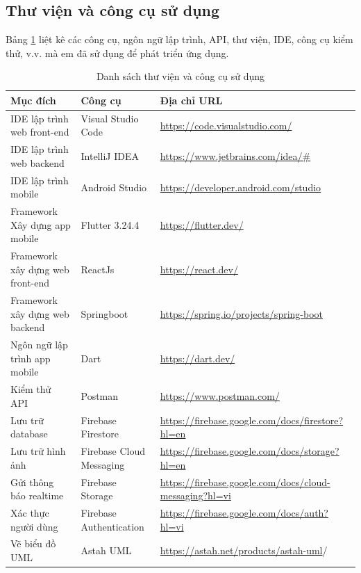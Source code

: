 \documentclass[../DoAn.tex]{subfiles}
\begin{document}
\subsection{Thư viện và công cụ sử dụng}
Bảng \ref{tab:my_label} liệt kê các công cụ, ngôn ngữ lập trình, API, thư viện, IDE, công cụ kiểm thử, v.v. mà em đã sử dụng để phát triển ứng dụng.
\begin{table}[H]
\centering{}
    \begin{tabular}{|p{4cm}|p{3cm}|p{7cm}|}
        \hline
        \textbf{Mục đích} & \textbf{Công cụ}       & \textbf{Địa chỉ URL}    \\ \hline
        IDE lập trình web front-end    & Visual Studio Code & \url{https://code.visualstudio.com/} \\ \hline
        IDE lập trình web backend    & IntelliJ IDEA & \url{https://www.jetbrains.com/idea/#} \\ \hline
        IDE lập trình mobile    & Android Studio & \url{https://developer.android.com/studio}  \\ \hline
        Framework Xây dựng app mobile              & Flutter 3.24.4                 & \url{https://flutter.dev/}                     \\ \hline
         Framework xây dựng web front-end              & ReactJs                   & \url{https://react.dev/} \\ \hline
         Framework xây dựng web backend & Springboot & \url{https://spring.io/projects/spring-boot}
         \\ \hline
         Ngôn ngữ lập trình app mobile & Dart & \url{https://dart.dev/}
         \\ \hline
         Kiểm thử API & Postman &
         \url{https://www.postman.com/}
         \\ \hline
         Lưu trữ database & Firebase Firestore & \url{https://firebase.google.com/docs/firestore?hl=en} 
         \\ \hline
         Lưu trữ hình ảnh & Firebase Cloud Messaging  & 
         \url{https://firebase.google.com/docs/storage?hl=en}
         \\ \hline
        Gửi thông báo realtime & Firebase Storage  & 
         \url{https://firebase.google.com/docs/cloud-messaging?hl=vi}
         \\ \hline
         Xác thực người dùng & Firebase Authentication  & 
         \url{https://firebase.google.com/docs/auth?hl=vi}
         \\ \hline
         Vẽ biểu đồ UML & Astah UML & 
         \url{https://astah.net/products/astah-uml}/
         \\ \hline
        \end{tabular}
    \caption{Danh sách thư viện và công cụ sử dụng}
    \label{tab:my_label}
\end{table}
\end{document}
